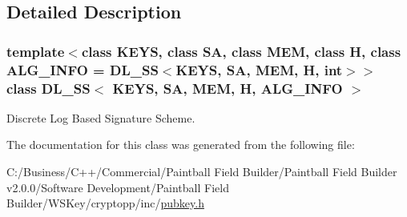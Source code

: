 \subsection{Detailed Description}
\subsubsection*{template$<$class KEYS, class SA, class MEM, class H, class ALG\_\-INFO = DL\_\-SS$<$KEYS, SA, MEM, H, int$>$$>$ class DL\_\-SS$<$ KEYS, SA, MEM, H, ALG\_\-INFO $>$}

Discrete Log Based Signature Scheme. 

The documentation for this class was generated from the following file:\begin{DoxyCompactItemize}
\item 
C:/Business/C++/Commercial/Paintball Field Builder/Paintball Field Builder v2.0.0/Software Development/Paintball Field Builder/WSKey/cryptopp/inc/\hyperlink{pubkey_8h}{pubkey.h}\end{DoxyCompactItemize}
